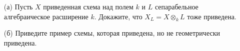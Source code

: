 \begin{comment}

\begin{tikzcd}[sep=large]
W \arrow[bend left=20,swap]{rrd}{\psi} \arrow[bend right=30,swap]{rdd}{\varphi} & & \\
& X \times_S Z \arrow{r}{p_2}  \arrow{d}{p_1}  & Z \arrow{d}{f} \\
& X \times_S Y \arrow{r}{p'_2} \arrow{d}{p'_1} & Y \arrow{d}{g} \\
& X \arrow{r}{h} & S                           
\end{tikzcd}
\end{comment}
\vskip 0.6in





\begin{prob}
\begin{itemize}
\item[]
\item[(а)] Пусть $X$ приведенная схема над полем $k$ и $L$ сепарабельное алгебраическое расширение $k$. Докажите, что $X_L=X \otimes_k L$ тоже приведена.
\item[(б)] Приведите пример схемы, которая приведена, но не геометрически приведена.
\end{itemize}
\end{prob}
